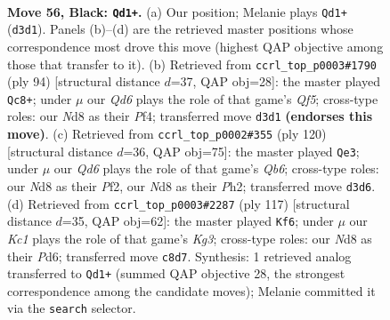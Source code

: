 \documentclass[11pt]{article}
\begin{document}
\clearpage

\begin{figure}[p]\centering
\begin{subfigure}{0.46\textwidth}\centering
\resizebox{\linewidth}{!}{%
\newchessgame
\chessboard[
  setfen={2kn2Q1/p1p3p1/1p4p1/2p5/8/2Pq4/1P6/K7 b - - 13 56},
  showmover=false,
  pgfstyle=straightmove, color=movearrow, markmove={d3-d1}
]}
\caption{}
\end{subfigure}\hfill
\begin{subfigure}{0.46\textwidth}\centering
\resizebox{\linewidth}{!}{%
\newchessgame
\chessboard[
  setfen={6k1/5pp1/8/5Q2/p3PP1p/2P4P/6PK/2q5 w - - 6 48},
  showmover=false,
  pgfstyle=straightmove, color=movearrow, markmove={f5-c8}
]}
\caption{}
\end{subfigure}
\\[4pt]
\begin{subfigure}{0.46\textwidth}\centering
\resizebox{\linewidth}{!}{%
\newchessgame
\chessboard[
  setfen={8/5pk1/1Q6/4p3/6p1/1P4Pp/P1K2P1P/6q1 w - - 23 61},
  showmover=false,
  pgfstyle=straightmove, color=movearrow, markmove={b6-e3}
]}
\caption{}
\end{subfigure}\hfill
\begin{subfigure}{0.46\textwidth}\centering
\resizebox{\linewidth}{!}{%
\newchessgame
\chessboard[
  setfen={5Q2/5p2/3p2k1/p1q4p/P1P5/6P1/6K1/8 b - - 29 59},
  showmover=false,
  pgfstyle=straightmove, color=movearrow, markmove={g6-f6}
]}
\caption{}
\end{subfigure}
\caption{\textbf{Move 56, Black: \texttt{Qd1+}.} (a) Our position; Melanie plays \texttt{Qd1+} (\texttt{d3d1}). Panels (b)--(d) are the retrieved master positions whose correspondence most drove this move (highest QAP objective among those that transfer to it). (b) Retrieved from \texttt{ccrl\_top\_p0003\#1790} (ply 94) [structural distance $d$=37, QAP obj=28]: the master played \texttt{Qc8+}; under $\mu$ our \emph{Qd6} plays the role of that game's \emph{Qf5}; cross-type roles: our \emph{N}d8 as their \emph{P}f4; transferred move \texttt{d3d1} \textbf{(endorses this move)}. (c) Retrieved from \texttt{ccrl\_top\_p0002\#355} (ply 120) [structural distance $d$=36, QAP obj=75]: the master played \texttt{Qe3}; under $\mu$ our \emph{Qd6} plays the role of that game's \emph{Qb6}; cross-type roles: our \emph{N}d8 as their \emph{P}f2, our \emph{N}d8 as their \emph{P}h2; transferred move \texttt{d3d6}. (d) Retrieved from \texttt{ccrl\_top\_p0003\#2287} (ply 117) [structural distance $d$=35, QAP obj=62]: the master played \texttt{Kf6}; under $\mu$ our \emph{Kc1} plays the role of that game's \emph{Kg3}; cross-type roles: our \emph{N}d8 as their \emph{P}d6; transferred move \texttt{c8d7}. Synthesis: 1 retrieved analog transferred to \texttt{Qd1+} (summed QAP objective 28, the strongest correspondence among the candidate moves); Melanie committed it via the \texttt{search} selector.}
\label{fig:thought-m111}
\end{figure}
\end{document}
